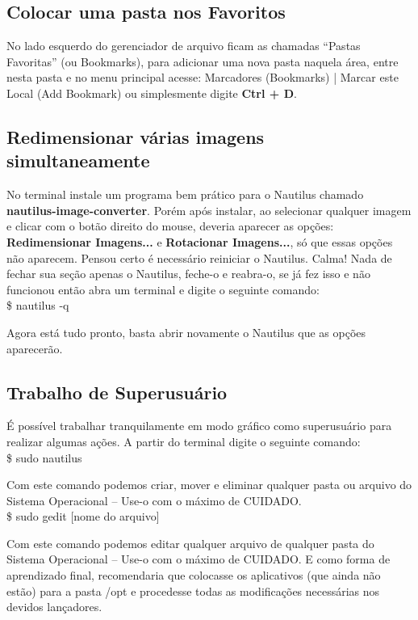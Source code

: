 \subsection{Colocar uma pasta nos Favoritos}
No lado esquerdo do gerenciador de arquivo ficam as chamadas “Pastas Favoritas” (ou Bookmarks), para adicionar uma nova pasta naquela área, entre nesta pasta e no menu principal acesse: Marcadores (Bookmarks) | Marcar este Local (Add Bookmark) ou simplesmente digite \textbf{Ctrl + D}.

\subsection{Redimensionar várias imagens simultaneamente}
No terminal instale um programa bem prático para o Nautilus chamado \textbf{nautilus-image-converter}. Porém após instalar, ao selecionar qualquer imagem e clicar com o botão direito do mouse, deveria aparecer as opções: \textbf{Redimensionar Imagens...} e \textbf{Rotacionar Imagens...}, só que essas opções não aparecem. Pensou certo é necessário reiniciar o Nautilus. Calma! Nada de fechar sua seção apenas o Nautilus, feche-o e reabra-o, se já fez isso e não funcionou então abra um terminal e digite o seguinte comando: \\
{\ttfamily\$ nautilus -q}

Agora está tudo pronto, basta abrir novamente o Nautilus que as opções aparecerão.

\subsection{Trabalho de Superusuário}
É possível trabalhar tranquilamente em modo gráfico como superusuário para realizar algumas ações. A partir do terminal digite o seguinte comando: \\
{\ttfamily\$ sudo nautilus}

Com este comando podemos criar, mover e eliminar qualquer pasta ou arquivo do Sistema Operacional – Use-o com o máximo de CUIDADO. \\
{\ttfamily\$ sudo gedit [nome do arquivo]}

Com este comando podemos editar qualquer arquivo de qualquer pasta do Sistema Operacional – Use-o com o máximo de CUIDADO.
E como forma de aprendizado final, recomendaria que colocasse os aplicativos (que ainda não estão) para a pasta /opt e procedesse todas as modificações necessárias nos devidos lançadores.

